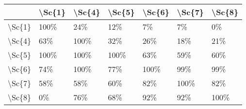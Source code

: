 \begin{tabular}{lllllll}
\toprule
{} & \textbackslash Sc\{1\} & \textbackslash Sc\{4\} & \textbackslash Sc\{5\} & \textbackslash Sc\{6\} & \textbackslash Sc\{7\} & \textbackslash Sc\{8\} \\
\midrule
\textbackslash Sc\{1\} &   100\% &    24\% &    12\% &     7\% &     7\% &     0\% \\
\textbackslash Sc\{4\} &    63\% &   100\% &    32\% &    26\% &    18\% &    21\% \\
\textbackslash Sc\{5\} &   100\% &   100\% &   100\% &    63\% &    59\% &    60\% \\
\textbackslash Sc\{6\} &    74\% &   100\% &    77\% &   100\% &    99\% &    99\% \\
\textbackslash Sc\{7\} &    58\% &    58\% &    60\% &    82\% &   100\% &    82\% \\
\textbackslash Sc\{8\} &     0\% &    76\% &    68\% &    92\% &    92\% &   100\% \\
\bottomrule
\end{tabular}
